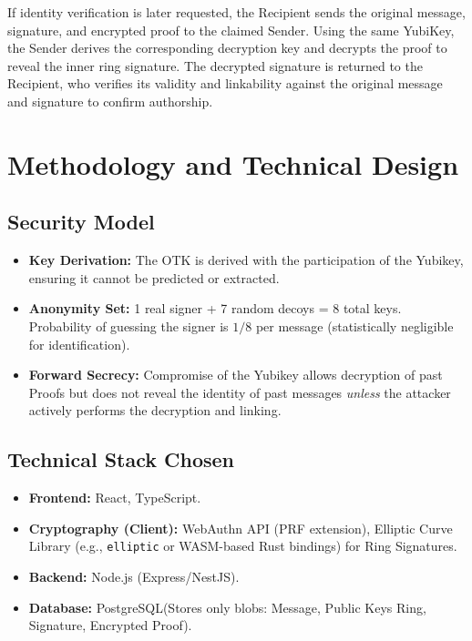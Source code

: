 \documentclass[letterpaper,11pt]{article}
\begin{document}
If identity verification is later requested, the Recipient sends the original message, signature, and encrypted proof to the claimed Sender. Using the same YubiKey, the Sender derives the corresponding decryption key and decrypts the proof to reveal the inner ring signature. The decrypted signature is returned to the Recipient, who verifies its validity and linkability against the original message and signature to confirm authorship.


\section{Methodology and Technical Design}

\subsection{Security Model}
\begin{itemize}
    \item \textbf{Key Derivation:} The OTK is derived with the participation of the Yubikey, ensuring it cannot be predicted or extracted.
    \item \textbf{Anonymity Set:} 1 real signer + 7 random decoys = 8 total keys. Probability of guessing the signer is $1/8$ per message (statistically negligible for identification).
    \item \textbf{Forward Secrecy:} Compromise of the Yubikey allows decryption of past Proofs but does not reveal the identity of past messages \textit{unless} the attacker actively performs the decryption and linking.
\end{itemize}

\subsection{Technical Stack Chosen}
\begin{itemize}
    \item \textbf{Frontend:} React, TypeScript.
    \item \textbf{Cryptography (Client):} WebAuthn API (PRF extension), Elliptic Curve Library (e.g., \texttt{elliptic} or WASM-based Rust bindings) for Ring Signatures.
    \item \textbf{Backend:} Node.js (Express/NestJS).
    \item \textbf{Database:} PostgreSQL(Stores only blobs: Message, Public Keys Ring, Signature, Encrypted Proof).
\end{itemize}
\end{document}
